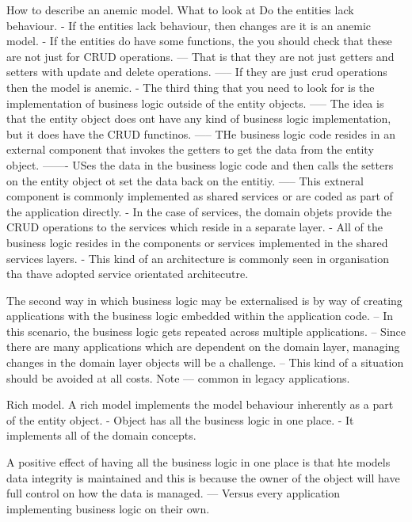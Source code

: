 \documentclass[a4paper, 11pt]{book}
\begin{document}
    How to describe an anemic model. What to look at
    Do the entities lack behaviour.
    - If the entities lack behaviour, then changes are it is an anemic model.
    - If the entities do have some functions, the you should check that these are not just for CRUD operations.
    --- That is that they are not just getters and setters with update and delete operations.
    ----- If they are just crud operations then the model is anemic.
    - The third thing that you need to look for is the implementation of business logic outside of the entity objects.
    ----- The idea is that the entity object does ont have any kind of business logic implementation, but it does have the CRUD functinos.
    ----- THe business logic code resides in an external component that invokes the getters to get the data from the entity object.
    ------- USes the data in the business logic code and then calls the setters on the entity object ot set the data back on the entitiy.
    ----- This extneral component is commonly implemented as shared services or are coded as part of the application directly.
    - In the case of services, the domain objets provide the CRUD operations to the services which reside in a separate layer.
    - All of the business logic resides in the components or services implemented in the shared services layers.
    - This kind of an architecture is commonly seen in organisation tha thave adopted service orientated architecutre.

    The second way in which business logic may be externalised is by way of creating applications with the business logic embedded within the application code.
    -- In this scenario, the business logic gets repeated across multiple applications.
    -- Since there are many applications which are dependent on the domain layer, managing changes in the domain layer objects will be a challenge.
    -- This kind of a situation should be avoided at all costs.
    Note --- common in legacy applications.


    Rich model.
    A rich model implements the model behaviour inherently as a part of the entity object.
    - Object has all the business logic in one place.
    - It implements all of the domain concepts.

    A positive effect of having all the business logic in one place is that hte models data integrity is maintained and this is because the owner of the object will have full control on how the data is managed.
    --- Versus every application implementing business logic on their own.
\end{document}
